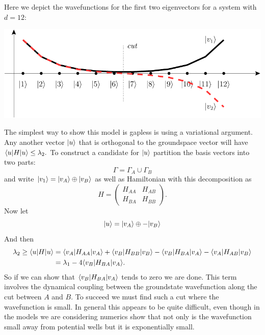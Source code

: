 Here we depict the wavefunctions for
the first two eigenvectors for a system with $d=12:$
\begin{center}
\includegraphics[]{pic-dwell.pdf}
\end{center}
The simplest way to show this model
is gapless is using a variational
argument.
Any another vector $|{u}\rangle$
that is orthogonal to the groundspace
vector will have $\langle{u}|H|{u}\rangle \le \lambda_2.$
To construct a candidate for $|{u}\rangle$
partition the
basis vectors into two parts:
$$
    \Gamma = \Gamma_A \cup \Gamma_B
$$
and write $|{v_1}\rangle = 
|{v_A}\rangle\oplus|{v_B}\rangle$
as well as Hamiltonian with this
decomposition as
$$
H = 
\left(\begin{array}{ll}
H_{AA} & H_{AB} \\
H_{BA} & H_{BB}
\end{array}\right).
$$
Now let
$$
    |{u}\rangle = |{v_A}\rangle \oplus -|{v_B}\rangle
$$
And then
\begin{align*}
    \lambda_2 \ge \langle{u}|H|{u}\rangle &= 
\langle{v_A}|H_{AA}|{v_A}\rangle +
\langle{v_B}|H_{BB}|{v_B}\rangle -
\langle{v_B}|H_{BA}|{v_A}\rangle -
\langle{v_A}|H_{AB}|{v_B}\rangle \\
    &= \lambda_1 - 4 \langle{v_B}|H_{BA}|{v_A}\rangle.
\end{align*}
So if we can show that 
$ \langle{v_B}|H_{BA}|{v_A}\rangle$
tends to zero we are done.
This term involves the 
dynamical coupling between the
groundstate wavefunction along
the cut between $A$ and $B$.
To succeed we must find such a cut where
the wavefunction is small. In general
this appears to be quite difficult,
even though in the models we are considering
numerics show that not only is the
wavefunction small away from potential wells
but it is exponentially small.



